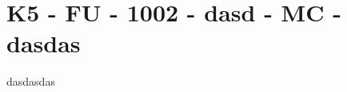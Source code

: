 \section{K5 - FU - 1002 - dasd - MC - dasdas}

\begin{beispiel}[K5 - FU]{2}
dasdasdas
\end{beispiel}